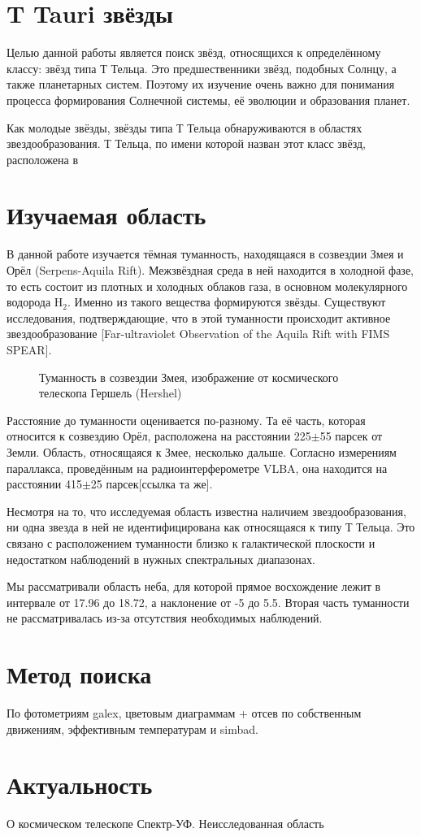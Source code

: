 

\section{T Tauri звёзды}
Целью данной работы является поиск звёзд, относящихся к определённому классу: звёзд типа Т Тельца. 
Это предшественники звёзд, подобных Солнцу, а также планетарных систем. Поэтому их изучение очень важно для понимания процесса формирования Солнечной системы, её эволюции и образования планет. 

Как молодые звёзды, звёзды типа Т Тельца обнаруживаются в областях звездообразования. Т Тельца, по имени которой назван этот класс звёзд, расположена в 

\section{Изучаемая область}

В данной работе изучается тёмная туманность, находящаяся в созвездии Змея и Орёл (Serpens-Aquila Rift). Межзвёздная среда в ней находится в холодной фазе, то есть состоит из плотных и холодных облаков газа, в основном молекулярного водорода H$_{2}$. Именно из такого вещества формируются звёзды. Существуют исследования, подтверждающие, что в этой туманности происходит активное звездообразование [Far-ultraviolet Observation of the Aquila Rift with FIMS SPEAR].

\begin{figure}[h]
\hfill
\caption{Туманность в созвездии Змея, изображение от космического телескопа Гершель (Hershel)}
\label{fig:area}
\end{figure}


Расстояние до туманности оценивается по-разному. Та её часть, которая относится к созвездию Орёл, расположена на расстоянии 225$\pm$55 парсек от Земли. Область, относящаяся к Змее, несколько дальше. Согласно измерениям параллакса, проведённым на радиоинтерферометре VLBA, она находится на расстоянии 415$\pm$25 парсек[ссылка та же].

Несмотря на то, что исследуемая область известна наличием звездообразования, ни одна звезда в ней не идентифицирована как относящаяся к типу Т Тельца. Это связано с расположением туманности близко к галактической плоскости и недостатком наблюдений в нужных спектральных диапазонах.

Мы рассматривали область неба, для которой прямое восхождение лежит в интервале от 17.96 до 18.72, а наклонение от -5 до 5.5. Вторая часть туманности не рассматривалась из-за отсутствия необходимых наблюдений.

\section{Метод поиска}

По фотометриям galex, цветовым диаграммам + отсев по собственным движениям, эффективным температурам и simbad.

\section{Актуальность}

О космическом телескопе Спектр-УФ. Неисследованная область